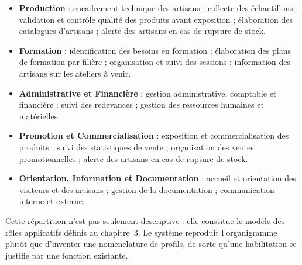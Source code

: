 \begin{itemize}[leftmargin=1.4em,itemsep=0.3em]
\item \textbf{Production} : encadrement technique des artisans ; collecte des échantillons ; validation et contrôle qualité des produits avant exposition ; élaboration des catalogues d'artisans ; alerte des artisans en cas de rupture de stock.
\item \textbf{Formation} : identification des besoins en formation ; élaboration des plans de formation par filière ; organisation et suivi des sessions ; information des artisans sur les ateliers à venir.
\item \textbf{Administrative et Financière} : gestion administrative, comptable et financière ; suivi des redevances ; gestion des ressources humaines et matérielles.
\item \textbf{Promotion et Commercialisation} : exposition et commercialisation des produits ; suivi des statistiques de vente ; organisation des ventes promotionnelles ; alerte des artisans en cas de rupture de stock.
\item \textbf{Orientation, Information et Documentation} : accueil et orientation des visiteurs et des artisans ; gestion de la documentation ; communication interne et externe.
\end{itemize}

Cette répartition n'est pas seulement descriptive : elle constitue le modèle des rôles applicatifs définis au chapitre~3. Le système reproduit l'organigramme plutôt que d'inventer une nomenclature de profils, de sorte qu'une habilitation se justifie par une fonction existante.

